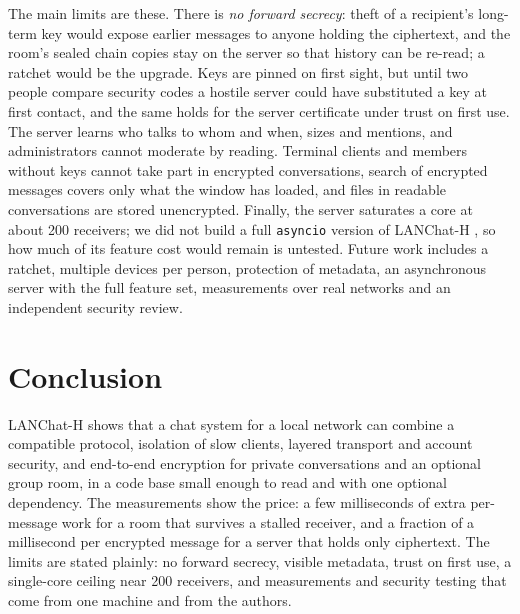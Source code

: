 \documentclass[graybox]{svmult}
\newcommand{\code}[1]{\texttt{#1}}
\newcommand{\lch}{\mbox{LANChat-H}}
\begin{document}
The main limits are these. There is \emph{no forward secrecy}: theft of a recipient's long-term key would expose earlier messages to anyone holding the ciphertext, and the room's sealed chain copies stay on the server so that history can be re-read; a ratchet \cite{signal,cohngordon} would be the upgrade. Keys are pinned on first sight, but until two people compare security codes a hostile server could have substituted a key at first contact, and the same holds for the server certificate under trust on first use. The server learns who talks to whom and when, sizes and mentions, and administrators cannot moderate by reading. Terminal clients and members without keys cannot take part in encrypted conversations, search of encrypted messages covers only what the window has loaded, and files in readable conversations are stored unencrypted. Finally, the server saturates a core at about 200 receivers; we did not build a full \code{asyncio} version of \lch{} \cite{pyasyncio}, so how much of its feature cost would remain is untested. Future work includes a ratchet, multiple devices per person, protection of metadata, an asynchronous server with the full feature set, measurements over real networks and an independent security review.

\section{Conclusion}
\label{sec:conclusion}
\lch{} shows that a chat system for a local network can combine a compatible protocol, isolation of slow clients, layered transport and account security, and end-to-end encryption for private conversations and an optional group room, in a code base small enough to read and with one optional dependency. The measurements show the price: a few milliseconds of extra per-message work for a room that survives a stalled receiver, and a fraction of a millisecond per encrypted message for a server that holds only ciphertext. The limits are stated plainly: no forward secrecy, visible metadata, trust on first use, a single-core ceiling near 200 receivers, and measurements and security testing that come from one machine and from the authors.
\end{document}
